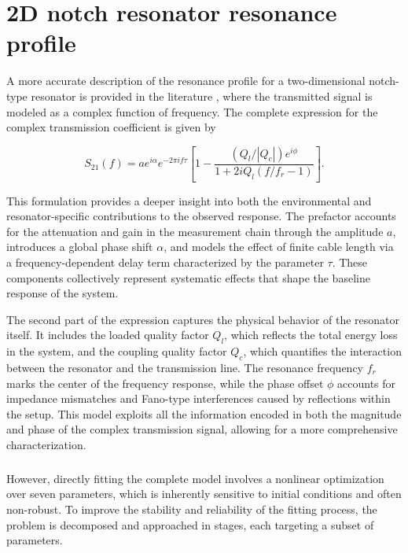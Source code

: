 \appendix

\chapter{2D notch resonator resonance profile} 
\label{app:AppendixA}

A more accurate description of the resonance profile for a two-dimensional notch-type resonator is provided in the literature \cite{Gao2008}, where the transmitted signal is modeled as a complex function of frequency. 
The complete expression for the complex transmission coefficient is given by

\begin{equation}
S_{21}(f) = ae^{i\alpha}e^{-2\pi i f \tau}\left[ 1 - \frac{(Q_l/|Q_c|)e^{i\phi}}{1 + 2iQ_l(f/f_r -1)} \right].
\end{equation}

This formulation provides a deeper insight into both the environmental and resonator-specific contributions to the observed response. 
The prefactor accounts for the attenuation and gain in the measurement chain through the amplitude $a$, introduces a global phase shift $\alpha$, and models the effect of finite cable length via a frequency-dependent delay term characterized by the parameter $\tau$. 
These components collectively represent systematic effects that shape the baseline response of the system.

The second part of the expression captures the physical behavior of the resonator itself. 
It includes the loaded quality factor $Q_l$, which reflects the total energy loss in the system, and the coupling quality factor $Q_c$, which quantifies the interaction between the resonator and the transmission line. 
The resonance frequency $f_r$ marks the center of the frequency response, while the phase offset $\phi$ accounts for impedance mismatches and Fano-type interferences caused by reflections within the setup.
This model exploits all the information encoded in both the magnitude and phase of the complex transmission signal, allowing for a more comprehensive characterization. 

\paragraph{}
However, directly fitting the complete model involves a nonlinear optimization over seven parameters, which is inherently sensitive to initial conditions and often non-robust. 
To improve the stability and reliability of the fitting process, the problem is decomposed and approached in stages, each targeting a subset of parameters.

